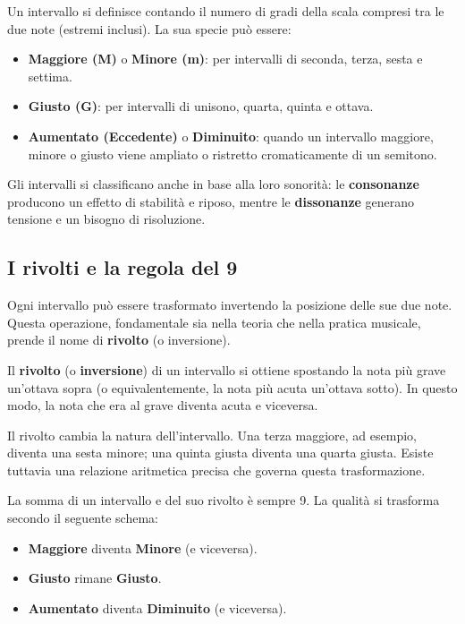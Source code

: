 \begin{definizione}
	\label{def:intervalli}
	Un intervallo si definisce contando il numero di gradi della scala compresi tra le due note (estremi inclusi). La sua specie può essere:
	\begin{itemize}
		\item \textbf{Maggiore (M)} o \textbf{Minore (m)}: per intervalli di seconda, terza, sesta e settima.
		\item \textbf{Giusto (G)}: per intervalli di unisono, quarta, quinta e ottava.
		\item \textbf{Aumentato (Eccedente)} o \textbf{Diminuito}: quando un intervallo maggiore, minore o giusto viene ampliato o ristretto cromaticamente di un semitono.
	\end{itemize}
\end{definizione}

Gli intervalli si classificano anche in base alla loro sonorità: le \textbf{consonanze} producono un effetto di stabilità e riposo, mentre le \textbf{dissonanze} generano tensione e un bisogno di risoluzione.

\subsection{I rivolti e la regola del 9}

Ogni intervallo può essere trasformato invertendo la posizione delle sue due note. Questa operazione, fondamentale sia nella teoria che nella pratica musicale, prende il nome di \textbf{rivolto} (o inversione).

\begin{definizione}
	\label{def:rivolto_intervallo}
	Il \textbf{rivolto} (o \textbf{inversione}) di un intervallo si ottiene spostando la nota più grave un'ottava sopra (o equivalentemente, la nota più acuta un'ottava sotto). In questo modo, la nota che era al grave diventa acuta e viceversa.
\end{definizione}

Il rivolto cambia la natura dell'intervallo. Una terza maggiore, ad esempio, diventa una sesta minore; una quinta giusta diventa una quarta giusta. Esiste tuttavia una relazione aritmetica precisa che governa questa trasformazione.

\begin{regola}
	\label{reg:regola_del_9}
	La somma di un intervallo e del suo rivolto è sempre 9. La qualità si trasforma secondo il seguente schema:
	\begin{itemize}
		\item \textbf{Maggiore} diventa \textbf{Minore} (e viceversa).
		\item \textbf{Giusto} rimane \textbf{Giusto}.
		\item \textbf{Aumentato} diventa \textbf{Diminuito} (e viceversa).
	\end{itemize}
\end{regola}

